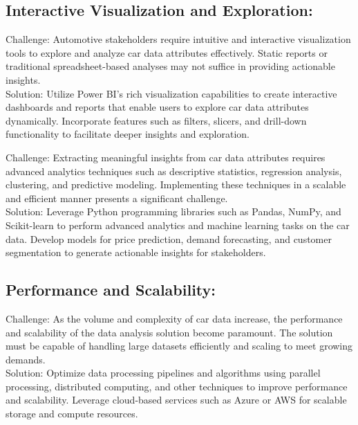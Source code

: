 \documentclass{article}
\begin{document}
{\subsection{Interactive Visualization and Exploration:}

Challenge: Automotive stakeholders require intuitive and interactive visualization tools to explore and analyze car data attributes effectively. Static reports or traditional spreadsheet-based analyses may not suffice in providing actionable insights.
\\
Solution: Utilize Power BI's rich visualization capabilities to create interactive dashboards and reports that enable users to explore car data attributes dynamically. Incorporate features such as filters, slicers, and drill-down functionality to facilitate deeper insights and exploration.


Challenge: Extracting meaningful insights from car data attributes requires advanced analytics techniques such as descriptive statistics, regression analysis, clustering, and predictive modeling. Implementing these techniques in a scalable and efficient manner presents a significant challenge.
\\
Solution: Leverage Python programming libraries such as Pandas, NumPy, and Scikit-learn to perform advanced analytics and machine learning tasks on the car data. Develop models for price prediction, demand forecasting, and customer segmentation to generate actionable insights for stakeholders.


\subsection{Performance and Scalability:}

Challenge: As the volume and complexity of car data increase, the performance and scalability of the data analysis solution become paramount. The solution must be capable of handling large datasets efficiently and scaling to meet growing demands.
\\
Solution: Optimize data processing pipelines and algorithms using parallel processing, distributed computing, and other techniques to improve performance and scalability. Leverage cloud-based services such as Azure or AWS for scalable storage and compute resources.

}

\end{document}
